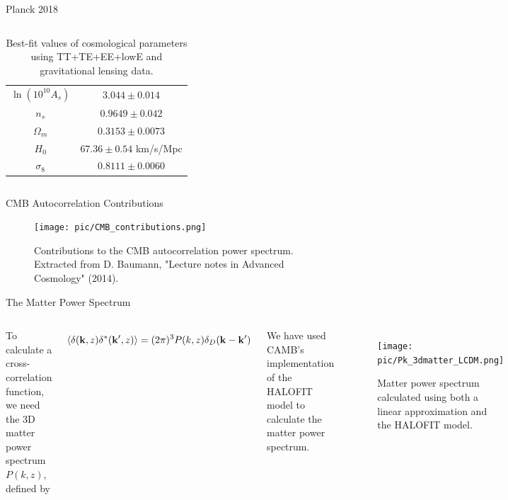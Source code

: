 \documentclass[serif, aspectratio=169]{beamer}
\begin{document}
\begin{frame}{Planck 2018}
\begin{columns}
\begin{table}[!htb]
\begin{tabular}{cc}
     $\ln{(10^{10}A_s)}$ & $3.044 \pm 0.014$ \\ 
     $n_s$ & $0.9649 \pm 0.042$ \\ \hline
     $\Omega_m$ & $0.3153 \pm 0.0073$ \\
     $H_0$ & $67.36 \pm 0.54$ km/s/Mpc \\
     $\sigma_8$ & $0.8111 \pm 0.0060$ \\ \hline
    \end{tabular}
    \caption{Best-fit values of cosmological parameters using TT+TE+EE+lowE and gravitational lensing data.}
    \label{tab:planck_parameters}
\end{table}
    \end{columns}
\end{frame}

\begin{frame}{CMB Autocorrelation Contributions}
	\begin{figure}
	\centering
	\texttt{[image: pic/CMB\_contributions.png]}
	\caption{Contributions to the CMB autocorrelation power spectrum. Extracted from D. Baumann, "Lecture notes in Advanced Cosmology" (2014).}
	\end{figure}
\end{frame}

\begin{frame}{The Matter Power Spectrum}
    \begin{columns}
    	To calculate a cross-correlation function, we need the 3D matter power spectrum $P(k,z)$, defined by
    	
    \begin{equation*}
        \left\langle \delta(\mathbf{k},z) \delta^*(\mathbf{k}',z) \right\rangle=(2\pi)^3 P(k,z)\delta_D(\mathbf{k}-\mathbf{k}')
    \end{equation*}
    
        We have used CAMB's implementation of the HALOFIT model to calculate the matter power spectrum.
        
    \begin{figure}
        \centering
        \texttt{[image: pic/Pk\_3dmatter\_LCDM.png]}
        \caption{Matter power spectrum calculated using both a linear approximation and the HALOFIT model.}
        \label{fig:Pk3dmatter}
    \end{figure}
\end{columns}
\end{frame}
\end{document}
